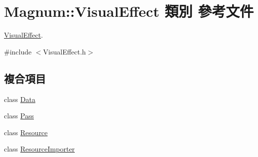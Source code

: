 \hypertarget{class_magnum_1_1_visual_effect}{}\section{Magnum\+:\+:Visual\+Effect 類別 參考文件}
\label{class_magnum_1_1_visual_effect}


\hyperlink{class_magnum_1_1_visual_effect}{Visual\+Effect}.  




{\ttfamily \#include $<$Visual\+Effect.\+h$>$}

\subsection*{複合項目}
\begin{DoxyCompactItemize}
\item 
class \hyperlink{class_magnum_1_1_visual_effect_1_1_data}{Data}
\item 
class \hyperlink{class_magnum_1_1_visual_effect_1_1_pass}{Pass}
\item 
class \hyperlink{class_magnum_1_1_visual_effect_1_1_resource}{Resource}
\item 
class \hyperlink{class_magnum_1_1_visual_effect_1_1_resource_importer}{Resource\+Importer}
\end{DoxyCompactItemize}
